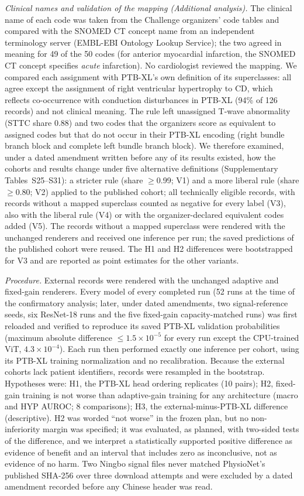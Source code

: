 \documentclass{wlscirep}
\begin{document}
\emph{Clinical names and validation of the mapping (Additional analysis).} The clinical name of each code was taken from the Challenge organizers' code tables and compared with the SNOMED CT concept name from an independent terminology server (EMBL-EBI Ontology Lookup Service); the two agreed in meaning for 49 of the 50 codes (for anterior myocardial infarction, the SNOMED CT concept specifies \emph{acute} infarction). No cardiologist reviewed the mapping. We compared each assignment with PTB-XL's own definition of its superclasses: all agree except the assignment of right ventricular hypertrophy to CD, which reflects co-occurrence with conduction disturbances in PTB-XL (94\% of 126 records) and not clinical meaning. The rule left unassigned T-wave abnormality (STTC share 0.88) and two codes that the organizers score as equivalent to assigned codes but that do not occur in their PTB-XL encoding (right bundle branch block and complete left bundle branch block). We therefore examined, under a dated amendment written before any of its results existed, how the cohorts and results change under five alternative definitions (Supplementary Tables~S25--S31): a stricter rule (share $\ge$0.99; V1) and a more liberal rule (share $\ge$0.80; V2) applied to the published cohort; all technically eligible records, with records without a mapped superclass counted as negative for every label (V3), also with the liberal rule (V4) or with the organizer-declared equivalent codes added (V5). The records without a mapped superclass were rendered with the unchanged renderers and received one inference per run; the saved predictions of the published cohort were reused. The H1 and H2 differences were bootstrapped for V3 and are reported as point estimates for the other variants.

\emph{Procedure.} External records were rendered with the unchanged adaptive and fixed-gain renderers. Every model of every completed run (52 runs at the time of the confirmatory analysis; later, under dated amendments, two signal-reference seeds, six ResNet-18 runs and the five fixed-gain capacity-matched runs) was first reloaded and verified to reproduce its saved PTB-XL validation probabilities (maximum absolute difference $\le1.5\times10^{-5}$ for every run except the CPU-trained ViT, $4.3\times10^{-4}$). Each run then performed exactly one inference per cohort, using its PTB-XL training normalization and no recalibration. Because the external cohorts lack patient identifiers, records were resampled in the bootstrap. Hypotheses were: H1, the PTB-XL head ordering replicates (10 pairs); H2, fixed-gain training is not worse than adaptive-gain training for any architecture (macro and HYP AUROC; 8 comparisons); H3, the external-minus-PTB-XL difference (descriptive). H2 was worded ``not worse'' in the frozen plan, but no non-inferiority margin was specified; it was evaluated, as planned, with two-sided tests of the difference, and we interpret a statistically supported positive difference as evidence of benefit and an interval that includes zero as inconclusive, not as evidence of no harm. Two Ningbo signal files never matched PhysioNet's published SHA-256 over three download attempts and were excluded by a dated amendment recorded before any Chinese header was read.
\end{document}
